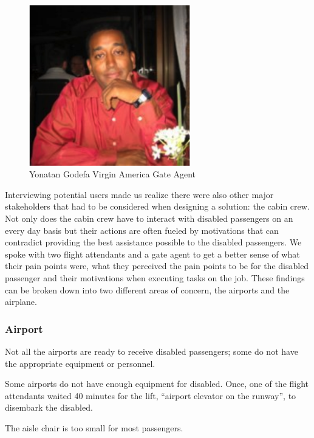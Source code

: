 \begin{figure}[h]
  \centering
     \includegraphics[width=7cm]{images/image031}
   \caption{Yonatan Godefa Virgin America Gate Agent}
  \label{fig:31}
\end{figure}

Interviewing potential users made us realize there were also other major stakeholders that had to be considered when designing a solution: the cabin crew. Not only does the cabin crew have to interact with disabled passengers on an every day basis but their actions are often fueled by motivations that can contradict providing the best assistance possible to the disabled passengers. We spoke with two flight attendants and a gate agent to get a better sense of what their pain points were, what they perceived the pain points to be for the disabled passenger and their motivations when executing tasks on the job. These findings can be broken down into two different areas of concern, the airports and the airplane. 

\subsubsection{Airport}
\begin{list}{-}{}
  \item Not all the airports are ready to receive disabled passengers; some do not have the appropriate equipment or personnel.
  \item Some airports do not have enough equipment for disabled. Once, one of the flight attendants waited 40 minutes for the lift, “airport elevator on the runway”, to disembark the disabled.
  \item The aisle chair is too small for most passengers.
\end{list}

